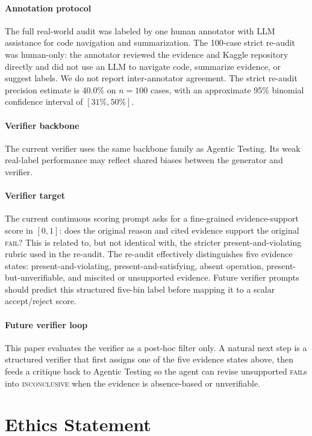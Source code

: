 \documentclass[11pt]{article}
\begin{document}
\paragraph{Annotation protocol}
The full real-world audit was labeled by one human annotator with LLM assistance for code navigation and summarization.
The 100-case strict re-audit was human-only: the annotator reviewed the evidence and Kaggle repository directly and did not use an LLM to navigate code, summarize evidence, or suggest labels.
We do not report inter-annotator agreement.
The strict re-audit precision estimate is 40.0\% on $n=100$ cases, with an approximate 95\% binomial confidence interval of $[31\%, 50\%]$.

\paragraph{Verifier backbone}
The current verifier uses the same backbone family as Agentic Testing.
Its weak real-label performance may reflect shared biases between the generator and verifier.

\paragraph{Verifier target}
The current continuous scoring prompt asks for a fine-grained evidence-support score in $[0,1]$: does the original reason and cited evidence support the original \textsc{fail}?
This is related to, but not identical with, the stricter present-and-violating rubric used in the re-audit.
The re-audit effectively distinguishes five evidence states: present-and-violating, present-and-satisfying, absent operation, present-but-unverifiable, and miscited or unsupported evidence.
Future verifier prompts should predict this structured five-bin label before mapping it to a scalar accept/reject score.

\paragraph{Future verifier loop}
This paper evaluates the verifier as a post-hoc filter only.
A natural next step is a structured verifier that first assigns one of the five evidence states above, then feeds a critique back to Agentic Testing so the agent can revise unsupported \textsc{fail}s into \textsc{inconclusive} when the evidence is absence-based or unverifiable.

\section*{Ethics Statement}
\end{document}
